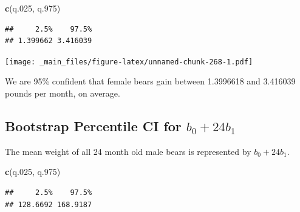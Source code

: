 \documentclass[]{book}
\newenvironment{Shaded}{\begin{snugshade}}{\end{snugshade}}
\newcommand{\KeywordTok}[1]{\textcolor[rgb]{0.13,0.29,0.53}{\textbf{#1}}}
\newcommand{\DecValTok}[1]{\textcolor[rgb]{0.00,0.00,0.81}{#1}}
\newcommand{\FloatTok}[1]{\textcolor[rgb]{0.00,0.00,0.81}{#1}}
\newcommand{\StringTok}[1]{\textcolor[rgb]{0.31,0.60,0.02}{#1}}
\newcommand{\OperatorTok}[1]{\textcolor[rgb]{0.81,0.36,0.00}{\textbf{#1}}}
\newcommand{\NormalTok}[1]{#1}
\begin{document}
\begin{Shaded}
\begin{Highlighting}[]
\KeywordTok{c}\NormalTok{(q.}\DecValTok{025}\NormalTok{, q.}\DecValTok{975}\NormalTok{)}
\end{Highlighting}
\end{Shaded}

\begin{verbatim}
##     2.5%    97.5% 
## 1.399662 3.416039
\end{verbatim}

\texttt{[image: \_main\_files/figure-latex/unnamed-chunk-268-1.pdf]}

We are 95\% confident that female bears gain between 1.3996618 and
3.416039 pounds per month, on average.

\subsection{\texorpdfstring{Bootstrap Percentile CI for
\(b_0 + 24b_1\)}{Bootstrap Percentile CI for b\_0 + 24b\_1}}\label{bootstrap-percentile-ci-for-b_0-24b_1}

The mean weight of all 24 month old male bears is represented by
\(b_0 + 24b_1\).

\begin{Shaded}
\end{Shaded}

\begin{Shaded}
\begin{Highlighting}[]
\KeywordTok{c}\NormalTok{(q.}\DecValTok{025}\NormalTok{, q.}\DecValTok{975}\NormalTok{)}
\end{Highlighting}
\end{Shaded}

\begin{verbatim}
##     2.5%    97.5% 
## 128.6692 168.9187
\end{verbatim}
\end{document}
